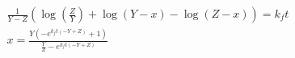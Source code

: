 \begin{align}
  \frac{1}{Y - Z} \left(\log{\left (\frac{Z}{Y} \right )} + \log{\left (Y - x \right )} - \log{\left (Z - x \right )}\right) = k_{f} t \\
  x = \frac{Y \left(- e^{k_{f} t \left(- Y + Z\right)} + 1\right)}{\frac{Y}{Z} - e^{k_{f} t \left(- Y + Z\right)}}
\end{align}